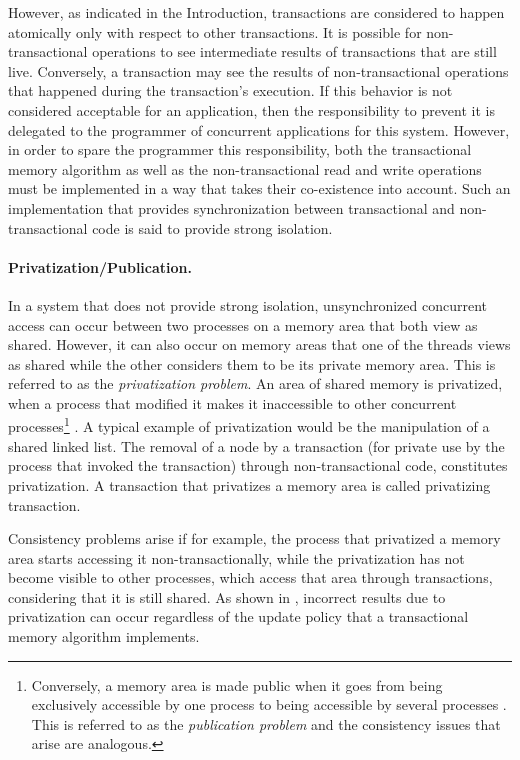 \documentclass[runningheads,a4paper]{llncs}
\begin{document}
However, as indicated in the Introduction, transactions are considered to  
happen atomically only  with respect to other transactions.  It is possible
for non-transactional operations to see intermediate results  
of transactions that are still  live. Conversely, a transaction may see the
results of non-transactional operations that happened during  
the  transaction{}'s   execution.  If  this  behavior   is  not  considered
acceptable for an application, then the responsibility to prevent it is  
delegated   to  the   programmer  of   concurrent  applications   for  this
system. However, in order to spare the programmer this responsibility,  
both the  transactional memory algorithm  as well as  the non-transactional
read and write operations must be implemented in a way  
that  takes their co-existence  into account.  Such an  implementation that
provides synchronization  between transactional and  non-transactional code
is said to provide strong isolation.  


\paragraph{Privatization/Publication.}
In  a  system  that  does  not  provide  strong  isolation,  unsynchronized
concurrent access can occur between two processes on a memory  
area that both  view as shared. However, it can also  occur on memory areas
that one of the threads views as shared while the other  
considers them to  be its private memory area. This is  referred to as the
{\it privatization problem}. An area of shared memory is privatized,  
when a process  that modified it makes it  inaccessible to other concurrent
processes\footnote{Conversely, a memory area is made public  
when it goes from being exclusively accessible by one process to being 
accessible by several processes \cite{spear08} . 
This is referred  to as the {\it publication problem} and the consistency 
issues that arise are analogous.}  \cite{spear07}.  
A typical  example of privatization would  be the manipulation  of a shared
linked list. The  removal of a node by a  transaction (for private
use   by  the process  that  invoked the  transaction) through  
non-transactional  code,  constitutes  privatization.  A  transaction  that
privatizes  a memory area   is called privatizing transaction.

Consistency problems  arise if for  example, the process that  privatized a
memory area starts accessing it non-transactionally, while the  
privatization has not become visible  to other processes, which access that
area through transactions, considering that it is still shared.  
As shown in \cite{spear07}, incorrect results due to
privatization can occur regardless of the update policy  
that a  transactional memory algorithm implements. 
\end{document}
